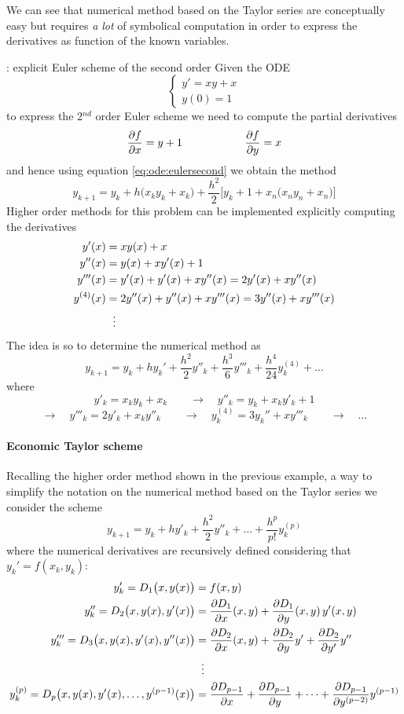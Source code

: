 		We can see that numerical method based on the Taylor series are conceptually easy but requires \textit{a lot} of symbolical computation in order to express the derivatives as function of the known variables.
		\begin{example}{: explicit Euler scheme of the second order}
			Given the ODE
			\[ \begin{cases}
				y' = xy + x \\ y(0) = 1 
			\end{cases} \]
			to express the 2$^{nd}$ order Euler scheme we need to compute the partial derivatives
			\[ \frac{\partial f}{\partial x} = y + 1 \hspace{2cm} \frac{\partial f}{\partial y} = x \]
			and hence using equation \ref{eq:ode:eulersecond} we obtain the method
			\[ y_{k+1} = y_k + h \big(x_k y_k + x_k\big)  +\frac {h^2}2 \Big[ y_k + 1 + x_n \big(x_ny_n + x_n\big) \Big] \]
			Higher order methods for this problem can be implemented explicitly computing the derivatives
			\begin{align*}
				y'(x) & = xy(x) + x  \\
				y''(x) & = y(x) + x y'(x) + 1 \\
				y'''(x) & = y'(x) + y'(x) + x y''(x) = 2 y'(x) + x y''(x) \\
				y^{(4)}(x) & = 2 y''(x) + y''(x) + xy'''(x) = 3 y''(x) + x y'''(x) \\
				& \hspace{2.2mm}  \vdots
			\end{align*}
			The idea is so to determine the numerical method as
			\[ y_{k+1} = y_k + h y_k' + \frac {h^2}2 y''_k + \frac{h^3}{6} y'''_k + \frac{h^4}{24} y_k^{(4)} + \dots \]
			where
			\[ y'_k = x_k y_k + x_k \qquad \rightarrow \quad y''_k = y_k +x_k y'_k +1 \] \[ \rightarrow \quad y'''_k = 2y'_k + x_k y''_k \qquad \rightarrow \quad y^{(4)}_k = 3 y_k'' + x y'''_k \qquad \rightarrow \quad \dots \]
		\end{example}
	
		\paragraph{Economic Taylor scheme} Recalling the higher order method shown in the previous example, a way to simplify the notation on the numerical method based on the Taylor series we consider the scheme
		\[ y_{k+1} = y_k + h y'_k + \frac{h^2}2 y''_k + \dots + \frac{h^p}{p!} y_k^{(p)} \]
		where the numerical derivatives are recursively defined considering that $y_k' = f(x_k,y_k)$:
		\begin{align*}
			y'_k = D_1\big(x,y(x) \big) & = f(x,y) \\
			y''_k = D_2\big(x,y(x), y'(x) \big) & = \frac{\partial D_1}{\partial x} (x,y) + \frac{\partial D_1}{\partial y} (x,y)\, y'(x,y) \\
			y'''_k = D_3\big(x,y(x), y'(x),y''(x) \big) & = \frac{\partial D_2}{\partial x} (x,y) + \frac{\partial D_2}{\partial y} y' + \frac{\partial D_2}{\partial y'}y''\\
			& \hspace{2mm} \vdots \\
			y^{(p)}_k = D_p\big(x,y(x),y'(x),\dots, y^{(p-1)}(x)\big) & = \frac{\partial D_{p-1}}{\partial x} + \frac{\partial D_{p-1}}{\partial y} + \dots + \frac{\partial D_{p-1}}{\partial y^{(p-2)}} y^{(p-1)}
		\end{align*}
			
